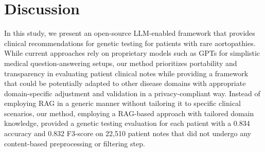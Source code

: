 \documentclass[fleqn,10pt]{wlscirep}
\begin{document}
 

\section*{Discussion}

In this study, we present an open-source LLM-enabled framework that provides clinical recommendations for genetic testing for patients with rare aortopathies. While current approaches rely on proprietary models such as GPTs for simplistic medical question-answering setups,\cite{chimirri2025consistent} our method prioritizes portability and transparency in evaluating patient clinical notes while providing a framework that could be potentially adapted to other disease domains with appropriate domain-specific adjustment and validation in a privacy-compliant way. Instead of employing RAG in a generic manner without tailoring it to specific clinical scenarios,\cite{zelin2024rare} our method, employing a RAG-based approach with tailored domain knowledge, provided a genetic testing evaluation for each patient with a 0.834 accuracy and 0.832 F3-score on 22,510 patient notes that did not undergo any content-based preprocessing or filtering step.
\end{document}

